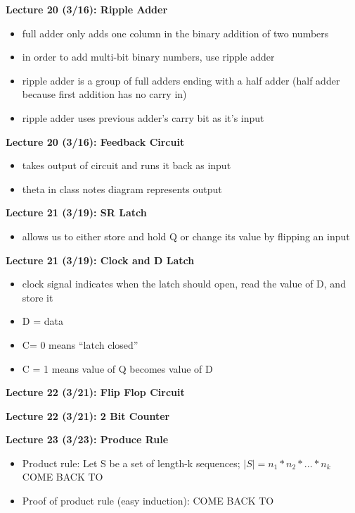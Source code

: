 \documentclass[twocolumn]{article}
\begin{document}
\textbf{Lecture 20 (3/16): Ripple Adder}
\begin{itemize}
    \item full adder only adds one column in the binary addition of two numbers
    \item in order to add multi-bit binary numbers, use ripple adder
    \item ripple adder is a group of full adders ending with a half adder (half adder because first addition has no carry in)
    \item ripple adder uses previous adder's carry bit as it's input
\end{itemize}

\textbf{Lecture 20 (3/16): Feedback Circuit}
\begin{itemize}
    \item takes output of circuit and runs it back as input
    \item theta in class notes diagram represents output
\end{itemize}

\textbf{Lecture 21 (3/19): SR Latch}
\begin{itemize}
    \item allows us to either store
and hold Q or change its value by flipping an input
\end{itemize}

\textbf{Lecture 21 (3/19): Clock and D Latch}
\begin{itemize}
    \item clock signal indicates when the latch should open, read the value of D, and store it
    \item D = data
    \item C= 0 means “latch closed”
    \item C = 1 means value of Q becomes value of D
\end{itemize}

\textbf{Lecture 22 (3/21): Flip Flop Circuit}

\textbf{Lecture 22 (3/21): 2 Bit Counter}

\textbf{Lecture 23 (3/23): Produce Rule}
\begin{itemize}
    \item Product rule: Let S be a set of length-k sequences; $|S|=n_1*n_2*...*n_k$ COME BACK TO
    \item Proof of product rule (easy induction): COME BACK TO
\end{itemize}
\end{document}
